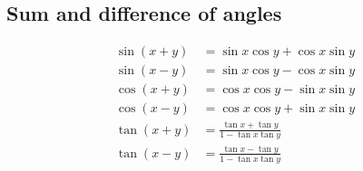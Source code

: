 \subsection*{Sum and difference of angles}

\begin{align*}
  \sin(x + y) &= \sin x \cos y + \cos x \sin y\\
  \sin(x - y) &= \sin x \cos y - \cos x \sin y\\
  \cos(x + y) &= \cos x \cos y - \sin x \sin y\\
  \cos(x - y) &= \cos x \cos y + \sin x \sin y\\
  \tan(x + y) &= \frac{\tan x + \tan y}{1 - \tan x \tan y}\\
  \tan(x - y) &= \frac{\tan x - \tan y}{1 - \tan x \tan y}
\end{align*}